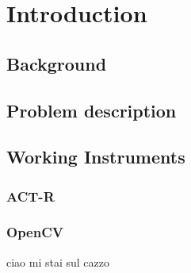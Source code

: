 \chapter{Introduction}
\section{Background}
\section{Problem description}
\section{Working Instruments}
\subsection{ACT-R}
\subsection{OpenCV}
	ciao
mi stai sul cazzo